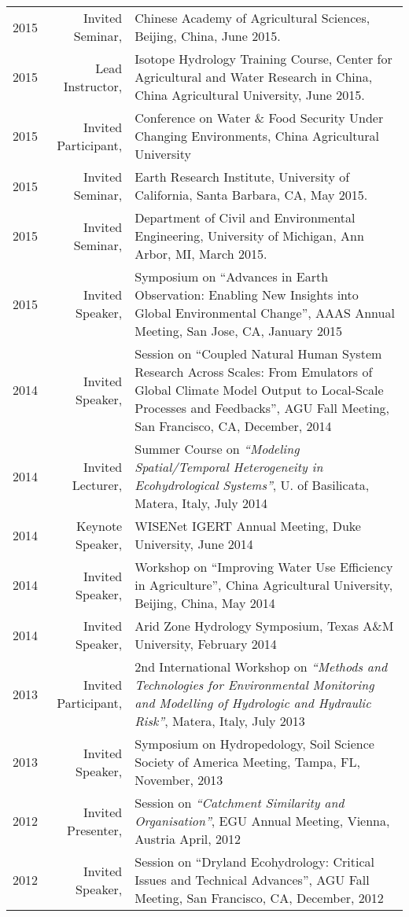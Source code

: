 \documentclass[10pt]{report}
\begin{document}
\begin{longtable}{p{.25in} r p{}}
2015 & Invited Seminar, & Chinese Academy of Agricultural Sciences, Beijing, China, June 2015. \\
2015 & Lead Instructor, & Isotope Hydrology Training Course, Center for Agricultural and Water Research in China, China Agricultural University, June 2015. \\
2015  & Invited Participant, & Conference on Water \& Food Security Under Changing Environments, China Agricultural University \\
2015 & Invited Seminar, & Earth Research Institute, University of California, Santa Barbara, CA, May 2015. \\
2015 & Invited Seminar, & Department of Civil and Environmental Engineering, University of Michigan, Ann Arbor, MI, March 2015. \\
2015 & Invited Speaker, & Symposium on ``Advances in Earth Observation: Enabling New Insights into Global Environmental Change'', AAAS Annual Meeting, San Jose, CA, January 2015 \\
2014 & Invited Speaker, & Session on ``Coupled Natural Human System Research Across Scales: From Emulators of Global Climate Model Output to Local-Scale Processes and Feedbacks'', AGU Fall Meeting, San Francisco, CA, December, 2014 \\
2014 & Invited Lecturer, &  Summer Course on \emph{``Modeling Spatial/Temporal Heterogeneity in Ecohydrological Systems''}, U. of Basilicata, Matera, Italy, July 2014 \\
2014 & Keynote Speaker, & WISENet IGERT Annual Meeting, Duke University, June 2014 \\
2014 & Invited Speaker, & Workshop on ``Improving Water Use Efficiency in Agriculture'', China Agricultural University, Beijing, China, May 2014 \\
2014 & Invited Speaker, & Arid Zone Hydrology Symposium, Texas A\&M University, February 2014 \\
2013 & Invited Participant, & 2nd International Workshop on \emph{``Methods and Technologies for Environmental Monitoring and Modelling of Hydrologic and Hydraulic Risk''}, Matera, Italy, July 2013 \\
2013 & Invited Speaker, & Symposium on Hydropedology, Soil Science Society of America Meeting, Tampa, FL, November, 2013 \\
2012 & Invited Presenter, &  Session on \emph{``Catchment Similarity and Organisation''}, EGU Annual Meeting, Vienna, Austria April, 2012 \\
2012 & Invited Speaker, & Session on ``Dryland Ecohydrology: Critical Issues and Technical Advances'', AGU Fall Meeting, San Francisco, CA, December, 2012 \\ 

\end{longtable}
\end{document}
